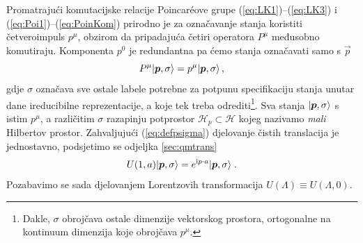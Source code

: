 Promatrajući komutacijske relacije Poincar\'{e}ove grupe 
(\ref{eq:LK1})--(\ref{eq:LK3}) i (\ref{eq:Poi1})--(\ref{eq:PoinKom})
prirodno je za označavanje stanja koristiti četveroimpuls $p^{\mu}$,
obzirom da pripadajuća četiri operatora $P^{\mu}$ međusobno komutiraju.
Komponenta $p^0$ je redundantna pa ćemo stanja označavati samo s $\vec{p}$
\begin{equation}
    P^{\mu} \ket{\vec{p}, \sigma} = p^{\mu} \ket{\vec{p}, \sigma} \,,
    \label{eq:defpsigma}
\end{equation}
gdje $\sigma$ označava sve ostale labele potrebne za potpunu specifikaciju
stanja unutar dane ireducibilne reprezentacije, a koje tek treba odrediti\footnote{Dakle,
    $\sigma$ obrojčava ostale dimenzije
vektorskog prostora, ortogonalne na kontinuum dimenzija koje obrojčava $p^{\mu}$.}.
Sva stanja $\ket{\vec{p}, \sigma}$ s istim $p^{\mu}$, a različitim $\sigma$
razapinju potprostor $\mathcal{H}_{p} \subset \mathcal{H}$ kojeg nazivamo
\emph{mali} Hilbertov prostor. Zahvaljujući (\ref{eq:defpsigma}) djelovanje
čistih translacija je jednostavno, podsjetimo se odjeljka \ref{sec:qmtrans} 
\begin{equation}
    U(1, a) \ket{\vec{p}, \sigma} = e^{\rmi p\cdot a}  \ket{\vec{p}, \sigma}\;.
    \label{eq:PoiTrans}
\end{equation}
Pozabavimo se sada djelovanjem Lorentzovih transformacija $U(\Lambda)\equiv U(\Lambda, 0)$.


